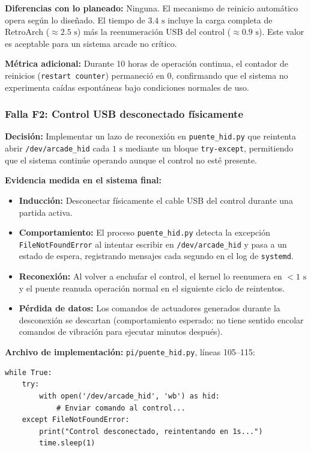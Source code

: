 \textbf{Diferencias con lo planeado:} Ninguna. El mecanismo de reinicio automático opera según lo diseñado. El tiempo de $3.4\text{ s}$ incluye la carga completa de RetroArch ($\approx 2.5\text{ s}$) más la reenumeración USB del control ($\approx 0.9\text{ s}$). Este valor es aceptable para un sistema arcade no crítico.

\textbf{Métrica adicional:} Durante 10 horas de operación continua, el contador de reinicios (\texttt{restart counter}) permaneció en 0, confirmando que el sistema no experimenta caídas espontáneas bajo condiciones normales de uso.

\subsubsection{Falla F2: Control USB desconectado físicamente}

\textbf{Decisión:} Implementar un lazo de reconexión en \texttt{puente\_hid.py} que reintenta abrir \texttt{/dev/arcade\_hid} cada $1\text{ s}$ mediante un bloque \texttt{try-except}, permitiendo que el sistema continúe operando aunque el control no esté presente.

\textbf{Evidencia medida en el sistema final:}
\begin{itemize}
	\item \textbf{Inducción:} Desconectar físicamente el cable USB del control durante una partida activa.
	\item \textbf{Comportamiento:} El proceso \texttt{puente\_hid.py} detecta la excepción \texttt{FileNotFoundError} al intentar escribir en \texttt{/dev/arcade\_hid} y pasa a un estado de espera, registrando mensajes cada segundo en el log de \texttt{systemd}.
	\item \textbf{Reconexión:} Al volver a enchufar el control, el kernel lo reenumera en $< 1\text{ s}$ y el puente reanuda operación normal en el siguiente ciclo de reintentos.
	\item \textbf{Pérdida de datos:} Los comandos de actuadores generados durante la desconexión se descartan (comportamiento esperado: no tiene sentido encolar comandos de vibración para ejecutar minutos después).
\end{itemize}

\textbf{Archivo de implementación:} \texttt{pi/puente\_hid.py}, líneas 105--115:
\begin{lstlisting}
while True:
    try:
        with open('/dev/arcade_hid', 'wb') as hid:
            # Enviar comando al control...
    except FileNotFoundError:
        print("Control desconectado, reintentando en 1s...")
        time.sleep(1)
\end{lstlisting}

